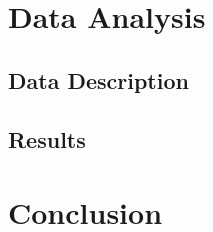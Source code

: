 \documentclass[12pt,a4paper,bibliography=totocnumbered,listof=totocnumbered]{scrartcl}
\begin{document}

\section{Data Analysis}

\subsection{Data Description}

\subsection{Results}


\section{Conclusion}

\pagebreak

\renewcommand\refname{List of Literature}






\pagebreak

\rhead{}
\setcounter{page}{1}
\end{document}
